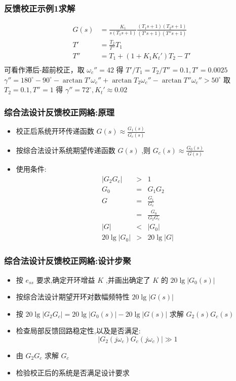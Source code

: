 \documentclass[table]{article}
\begin{document}
\begin{frame}
\frametitle{反馈校正示例1求解}
\label{sec-6-3-3}

\begin{align*}
G(s) &=\frac{K_1}{s(T_1s+1)}\frac{(T_1s+1)(T_2s+1)}{(T's+1)(T''s+1)}\\
T' &=\frac{T_2}{T''}T_1 \\
T'' &= T_1+(1+K_1K_t')T_2-T' \\
\end{align*}
可看作滞后-超前校正，取 $\omega_c''=42$ 得 $T'/T_1=T_2/T''=0.1,T'=0.0025$
$\gamma''=180^{\circ}-90^{\circ}-\arctan T'\omega_c''+\arctan T_2\omega_c''-\arctan T''\omega_c''>50^{\circ}$ 取 $T_2=0.1,T''=1$ 得 $\gamma''=72^{\circ},K_t'\approx 0.02$
\end{frame}
\begin{frame}
\frametitle{综合法设计反馈校正网絡:原理}
\label{sec-6-3-4}

\begin{itemize}
\item 校正后系统开环传递函数  $G(s)\approx\frac{G_1(s)}{G_c(s)}$
\item <2->按综合法设计系统期望传递函数  $G(s)$  ,则 $G_c(s)\approx\frac{G_0(s)}{G(s)}$
\item <3->使用条件:
      \begin{eqnarray*}
       |G_2 G_c| & > & 1 \\
       G_0 & = & G_1 G_2 \\
       G &=& \frac{G_1}{G_c}\\
	 &=& \frac{G_0}{G_2 G_c} \\
       |G| & <& | G_{0} | \\ 
       20\lg|G_0|&>&20\lg|G|
      \end{eqnarray*}
\end{itemize}
\end{frame}
\begin{frame}
\frametitle{综合法设计反馈校正网絡:设计步聚}
\label{sec-6-3-5}

\begin{itemize}
\item 按  $e_{ss}$  要求,确定开环增益 $K$  ,并画出确定了 $K$  的 $20\lg|G_0(s)|$
\item 按综合法设计期望开环对数幅频特性 $20\lg|G(s)|$
\item <2->按  $20\lg|G_2 G_c|=20\lg|G_0(s)|-20\lg |G(s)|$  求解  $G_2(s)G_c(s)$
\item <3->检查局部反馈回路稳定性,以及是否满足:  
	    \[|G_2(j\omega_c)G_c(j\omega_c)|\gg 1\]
\item <4->由 $G_2G_c$ 求解 $G_c$
\item <5->检验校正后的系统是否满足设计要求
\end{itemize}
\end{frame}
\end{document}
